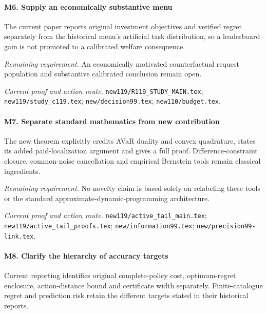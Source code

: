 \paragraph{M6. Supply an economically substantive menu}

The current paper reports original investment objectives and verified regret separately from the historical menu's artificial task distribution, so a leaderboard gain is not promoted to a calibrated welfare consequence.

\par\emph{Remaining requirement.} An economically motivated counterfactual request population and substantive calibrated conclusion remain open.

\par\emph{Current proof and action route.} \nolinkurl{new119/R119_STUDY_MAIN.tex}; \nolinkurl{new119/study_c119.tex}; \nolinkurl{new/decision99.tex}; \nolinkurl{new110/budget.tex}.

\paragraph{M7. Separate standard mathematics from new contribution}

The new theorem explicitly credits AVaR duality and convex quadrature, states its added paid-localization argument and gives a full proof. Difference-constraint closure, common-noise cancellation and empirical Bernstein tools remain classical ingredients.

\par\emph{Remaining requirement.} No novelty claim is based solely on relabeling these tools or the standard approximate-dynamic-programming architecture.

\par\emph{Current proof and action route.} \nolinkurl{new119/active_tail_main.tex}; \nolinkurl{new119/active_tail_proofs.tex}; \nolinkurl{new/information99.tex}; \nolinkurl{new/precision99-link.tex}.

\paragraph{M8. Clarify the hierarchy of accuracy targets}

Current reporting identifies original complete-policy cost, optimum-regret enclosure, action-distance bound and certificate width separately. Finite-catalogue regret and prediction risk retain the different targets stated in their historical reports.

